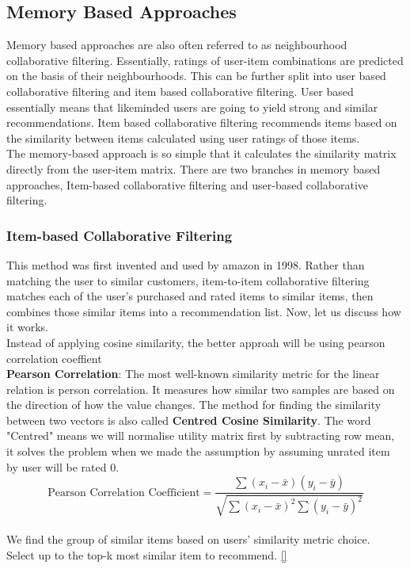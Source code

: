\subsection{Memory Based Approaches}
Memory based approaches are also often referred to as neighbourhood collaborative filtering. Essentially, ratings of user-item combinations are predicted on the basis of their neighbourhoods. 
This can be further split into user based collaborative filtering and item based collaborative filtering. 
User based essentially means that likeminded users are going to yield strong and similar recommendations. Item based collaborative filtering recommends items based on the similarity between items calculated using user ratings of those items.
\\The memory-based approach is so simple that it calculates the similarity matrix directly from the user-item matrix. There are two branches in memory based approaches, Item-based collaborative filtering and user-based collaborative filtering.

\subsubsection{Item-based Collaborative Filtering}
This method was first invented and used by amazon in 1998. 
Rather than matching the user to similar customers, item-to-item collaborative filtering matches each of the user’s purchased and rated items to similar items, then combines those similar items into a recommendation list. Now, let us discuss how it works.
\\Instead of applying cosine similarity, the better approah will be using pearson correlation coeffient
\\\textbf{Pearson Correlation}: The most well-known similarity metric for the linear relation is person correlation. It measures how similar two samples are based on the direction of how the value changes. 
The method for finding the similarity between two vectors is also called \textbf{Centred Cosine Similarity}. The word "Centred" means we will normalise utility matrix first by subtracting row mean, it solves the problem when we made the assumption by assuming unrated item by user will be rated 0. 
\begin{equation*}
\text{Pearson Correlation Coefficient} = \frac{\sum(x_{i} - \bar{x})(y_{i} - \bar{y})} {\sqrt{\sum(x_{i} - \bar{x})^{2} \sum{(y_{i} - \bar{y})^{2} }}}
\end{equation*}
\\We find the group of similar items based on users' similarity metric choice.
\\Select up to the top-k most similar item to recommend. \autoref{}


